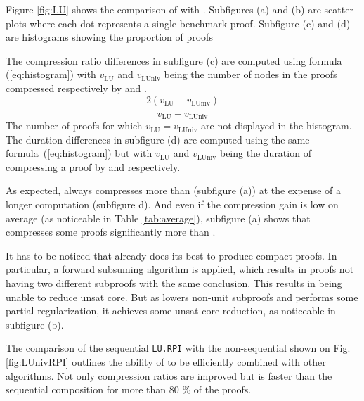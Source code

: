\documentclass{llncs}
\begin{document}
\newcommand{\va}[1]{\ensuremath{v_{\text{#1}}}}

Figure \ref{fig:LU} shows the comparison of {\LowerUnits} with {\LowerUnivalents}. Subfigures (a) and (b) are scatter plots where each dot represents a single benchmark proof. 
Subfigure (c) and (d) are histograms showing the proportion of proofs 

The compression
ratio differences in subfigure (c) are computed using formula (\ref{eq:histogram}) with \va{LU}
and \va{LUniv} being the number of nodes in the proofs compressed respectively by {\LowerUnits} and
{\LowerUnivalents}.
\begin{equation} \label{eq:histogram}
  \frac { 2(\va{LU} - \va{LUniv}) }{ \va{LU} + \va{LUniv} }
\end{equation}
The number of proofs for which $\va{LU} = \va{LUniv}$ are not displayed in the histogram.
The duration differences in subfigure (d) are computed using the same formula~(\ref{eq:histogram}) but
with \va{LU} and \va{LUniv} being the duration of compressing a proof by {\LowerUnits} and
{\LowerUnits} respectively.



As expected, {\LowerUnivalents} always compresses more than {\LowerUnits} (subfigure (a)) at the expense of a longer
computation (subfigure d). And even if the compression gain is low on average (as noticeable in Table \ref{tab:average}), subfigure (a) shows that {\LowerUnivalents} compresses some proofs significantly more than {\LowerUnits}.

It has to be noticed that \veriT already does its best to produce compact proofs. In particular,
a forward subsuming algorithm is applied, which results in proofs not having two different subproofs
with the same conclusion. This results in {\LowerUnits} being unable to reduce unsat core.
But as {\LowerUnivalents} lowers non-unit subproofs and performs some partial regularization, it
achieves some unsat core reduction, as noticeable in subfigure (b).

The comparison of the sequential \texttt{LU.RPI} with the non-sequential {\LUnivRPI} shown on Fig.
\ref{fig:LUnivRPI} outlines the ability of {\LowerUnivalents} to be efficiently combined with other
algorithms. Not only compression ratios are improved but {\LUnivRPI} is faster than the sequential
composition for more than 80 \% of the proofs.




\end{document}
